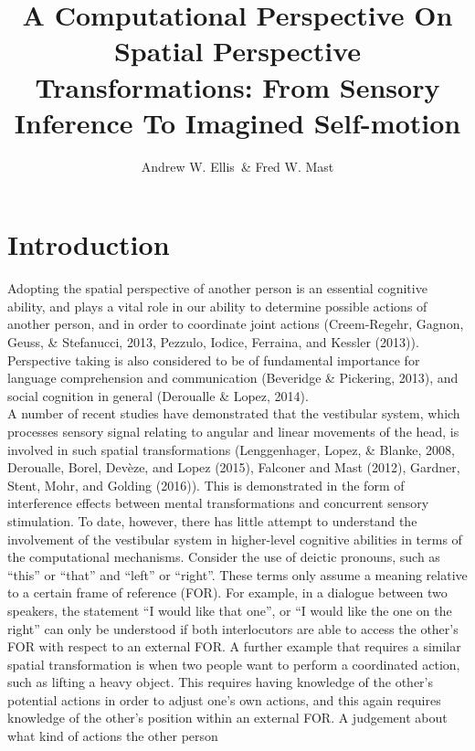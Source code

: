 \documentclass[english,floatsintext,man]{apa6}
\title{A Computational Perspective On Spatial Perspective Transformations: From
Sensory Inference To Imagined Self-motion}
\author{Andrew W. Ellis~\& Fred W. Mast}
\affiliation{
    \vspace{0.5cm}
          \textsuperscript{} Department of Psychology, University of Bern, Switzerland  }
\theoremstyle{definition}
\theoremstyle{definition}
\theoremstyle{remark}
\begin{document}
\maketitle

\setcounter{secnumdepth}{0}



\section{Introduction}\label{introduction}

Adopting the spatial perspective of another person is an essential
cognitive ability, and plays a vital role in our ability to determine
possible actions of another person, and in order to coordinate joint
actions (Creem-Regehr, Gagnon, Geuss, \& Stefanucci, 2013, Pezzulo,
Iodice, Ferraina, and Kessler (2013)). Perspective taking is also
considered to be of fundamental importance for language comprehension
and communication (Beveridge \& Pickering, 2013), and social cognition
in general (Deroualle \& Lopez, 2014).\\
 A number of recent studies have demonstrated that the vestibular
system, which processes sensory signal relating to angular and linear
movements of the head, is involved in such spatial transformations
(Lenggenhager, Lopez, \& Blanke, 2008, Deroualle, Borel, Devèze, and
Lopez (2015), Falconer and Mast (2012), Gardner, Stent, Mohr, and
Golding (2016)). This is demonstrated in the form of interference
effects between mental transformations and concurrent sensory
stimulation. To date, however, there has little attempt to understand
the involvement of the vestibular system in higher-level cognitive
abilities in terms of the computational mechanisms. Consider the use of
deictic pronouns, such as \enquote{this} or \enquote{that} and
\enquote{left} or \enquote{right}. These terms only assume a meaning
relative to a certain frame of reference (FOR). For example, in a
dialogue between two speakers, the statement \enquote{I would like that
one}, or \enquote{I would like the one on the right} can only be
understood if both interlocutors are able to access the other's FOR with
respect to an external FOR. A further example that requires a similar
spatial transformation is when two people want to perform a coordinated
action, such as lifting a heavy object. This requires having knowledge
of the other's potential actions in order to adjust one's own actions,
and this again requires knowledge of the other's position within an
external FOR. A judgement about what kind of actions the other person
\end{document}
